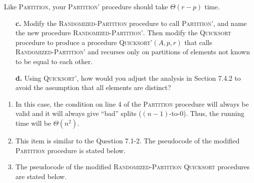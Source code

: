 \documentclass{report}
\makeatletter
\renewenvironment{framed}{%
 \def\FrameCommand##1{\hskip\@totalleftmargin
 \fboxsep=\FrameSep\fbox{##1}}%
 \MakeFramed {\advance\hsize-\width
   \@totalleftmargin\z@ \linewidth\hsize
   \@setminipage}}%
 {\par\unskip\endMakeFramed}
\let\oldnl\nl%
\newcommand{\nonl}{\renewcommand{\nl}{\let\nl\oldnl}}%
\makeatother
\begin{document}
\begin{enumerate}
{\begin{enumerate}
{Like \textsc{Partition}, your \textsc{Partition'} procedure should take
$\Theta(r - p)$ time.
}
\end{enumerate}

\begin{enumerate}
\item[\textbf{c.}]{Modify the \textsc{Randomized-Partition} procedure to call
\textsc{Partition'}, and name the new procedure \textsc{Randomized-Partition'}.
Then modify the \textsc{Quicksort} procedure to produce a procedure
\textsc{Quicksort'}$(A, p, r)$ that calls \textsc{Randomized-Partition'} and
recurses only on partitions of elements not known to be equal to each other.}

\item[\textbf{d.}]{Using \textsc{Quicksort'}, how would you adjust the analysis
in Section 7.4.2 to avoid the assumption that all elements are distinct?}
\end{enumerate}
}

\begin{framed}
\begin{enumerate}
\item{In this case, the condition on line 4 of the \textsc{Partition} procedure
will always be valid and it will always give ``bad'' splits
($(n - 1)$-to-0). Thus, the running time will be $\Theta(n^2)$.}
\item{This item is similar to the Question 7.1-2. The pseudocode of the modified
\textsc{Partition} procedure is stated below.

\begin{algorithm}[H]
\SetAlgoNoEnd\DontPrintSemicolon
\BlankLine
{}
\nonl{}
\end{algorithm}
}
\item{The pseudocode of the modified \textsc{Randomized-Partition}
\textsc{Quicksort} procedures are stated below.

\begin{algorithm}[H]
\SetAlgoNoEnd\DontPrintSemicolon
\BlankLine
{}
\nonl{}
\end{algorithm}

}
\end{enumerate}
\end{framed}
\end{enumerate}
\end{document}
